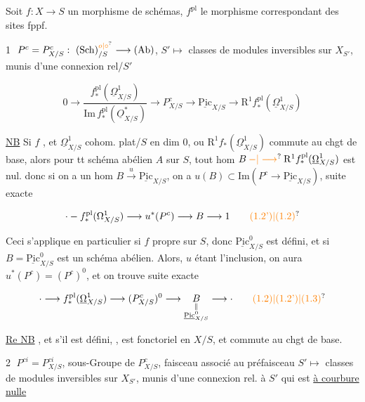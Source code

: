 Soit $f:X\longrightarrow S$ un morphisme de schémas, $f^{\mathrm{pl}}$ le morphisme correspondant des sites fppf.

\textcircled{1} $P^c=P^c_{X/S}:\ (\mathrm{Sch})_{/S}^{\unsure{o|\circ}}\longrightarrow(\mathrm{Ab})$,   $S'\longmapsto$ classes de modules inversibles sur $X_{S'}$, munis d'une connexion rel/$S'$

\[
0\longrightarrow\frac{f_*^{\mathrm{pl}}(\underline\Omega^1_{X/S})}{\mathrm{Im}\, f_*^{\mathrm{pl}}(\underline O^*_{X/S})}
\longrightarrow P^c_{X/S}\longrightarrow\underline{\mathrm{Pic}}_{X/S}
\longrightarrow\mathrm R^1 f_*^{\mathrm{pl}}(\underline\Omega^1_{X/S})\tag*{(1.1)}
\]




\uline{NB} Si $f$ , et $\underline\Omega^1_{X/S}$ cohom. plat/$S$ en dim $0$, ou $\mathrm R^1 f_*(\underline\Omega^1_{X/S})$ commute au chgt de base, alors pour tt schéma abélien $A$ sur $S$, tout hom $B\mathbin{\unsure{-|\longrightarrow}}\mathrm R^1 f_*^{\mathrm{pl}}(\underline\Omega^{1}_{X/S})$ est nul. donc si on a un hom $B\overset{u}{\longrightarrow}\underline{\mathrm{Pic}}_{X/S}$, on a $u(B)\subset\mathrm{Im}(P^c\longrightarrow\underline{\mathrm{Pic}}_{X/S})$,  suite exacte

\[
\cdot\mathbin{-}f_*^{\mathrm{pl}}(\Omega^1_{X/S})\longrightarrow u^*(P^c)\longrightarrow B\longrightarrow1
\tag*{\unsure{(1.2')|(1.2)}}
\]

Ceci s'applique en particulier si \uline{$f$} propre sur $S$,  donc $\underline{\mathrm{Pic}}^0_{X/S}$ est défini, et si $\boxed{B=\underline{\mathrm{Pic}}^0_{X/S}}$ est un schéma abélien. Alors, $u$ étant l'inclusion, on aura $u^*(P^c)=(P^c)^0$, et on trouve suite exacte

\[
\cdot\longrightarrow f_*^{\mathrm{pl}}(\underline\Omega^1_{X/S})\longrightarrow(P^c_{X/S})^0
\longrightarrow\underset{\substack{\Vert\\\underline{\mathrm{Pic}}^0_{X/S}}}{B}\longrightarrow\cdot
\tag*{\unsure{(1.2)|(1.2')|(1.3)}}
\]

\uline{Re NB} , et s'il est défini, , est fonctoriel en $X/S$, et commute au chgt de base.

\textcircled{2} $P^{ci}=P^{ci}_{X/S}$, sous-Groupe de $P^c_{X/S}$, faisceau associé au préfaisceau $S'\longmapsto$ classes de modules inversibles sur $X_{S'}$, munis d'une connexion rel. à $S'$ qui est \uline{à courbure nulle}

